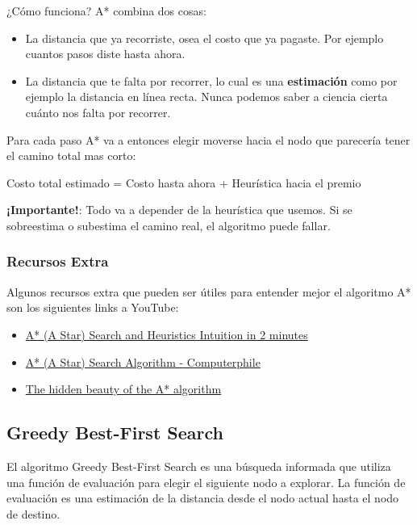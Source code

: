 \documentclass[12pt]{article}
\begin{document}
\vspace{0.5em}

¿Cómo funciona? A* combina dos cosas:
\begin{itemize}
    \item La distancia que ya recorriste, osea el costo que ya pagaste. Por ejemplo cuantos pasos diste hasta ahora.
    \item La distancia que te falta por recorrer, lo cual es una \textbf{estimación} como por ejemplo la distancia en línea recta. Nunca podemos saber a ciencia cierta cuánto nos falta por recorrer.
\end{itemize}

Para cada paso A* va a entonces elegir moverse hacia el nodo que parecería tener el camino total mas corto:

\begin{center}
    Costo total estimado = Costo hasta ahora + Heurística hacia el premio
\end{center}

\textbf{¡Importante!}: Todo va a depender de la heurística que usemos. Si se sobreestima o subestima el camino real, el algoritmo puede fallar.

\subsubsection{Recursos Extra}

Algunos recursos extra que pueden ser útiles para entender mejor el algoritmo A* son los siguientes links a YouTube:

\begin{itemize}
    \item \href{https://youtu.be/71CEj4gKDnE?si=n1dtpt7w6tSC1j2x}{A* (A Star) Search and Heuristics Intuition in 2 minutes}
    \item \href{https://youtu.be/ySN5Wnu88nE?si=CJq_WDwzfNK9NtEs}{A* (A Star) Search Algorithm - Computerphile}
    \item \href{https://youtu.be/ySN5Wnu88nE?si=CJq_WDwzfNK9NtEs}{The hidden beauty of the A* algorithm}
\end{itemize}

\subsection{Greedy Best-First Search}

El algoritmo Greedy Best-First Search es una búsqueda informada que utiliza una función de evaluación para elegir el siguiente nodo a explorar. La función de evaluación es una estimación de la distancia desde el nodo actual hasta el nodo de destino.
\end{document}

